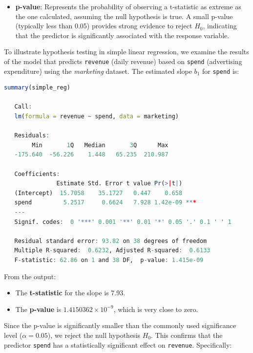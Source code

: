 \documentclass[
]{book}
\newcommand{\passthrough}[1]{#1}
\providecommand{\tightlist}{%
  \setlength{\itemsep}{0pt}\setlength{\parskip}{0pt}}
\theoremstyle{definition}
\theoremstyle{definition}
\theoremstyle{definition}
\theoremstyle{definition}
\theoremstyle{remark}
\begin{document}
\begin{itemize}
\tightlist
\item
  \textbf{p-value}: Represents the probability of observing a t-statistic as extreme as the one calculated, assuming the null hypothesis is true. A small p-value (typically less than 0.05) provides strong evidence to reject \(H_0\), indicating that the predictor is significantly associated with the response variable.
\end{itemize}

To illustrate hypothesis testing in simple linear regression, we examine the results of the model that predicts \passthrough{\lstinline!revenue!} (daily revenue) based on \passthrough{\lstinline!spend!} (advertising expenditure) using the \emph{marketing} dataset. The estimated slope \(b_1\) for \passthrough{\lstinline!spend!} is:

\begin{lstlisting}[language=R]
summary(simple_reg)
   
   Call:
   lm(formula = revenue ~ spend, data = marketing)
   
   Residuals:
        Min       1Q   Median       3Q      Max 
   -175.640  -56.226    1.448   65.235  210.987 
   
   Coefficients:
               Estimate Std. Error t value Pr(>|t|)    
   (Intercept)  15.7058    35.1727   0.447    0.658    
   spend         5.2517     0.6624   7.928 1.42e-09 ***
   ---
   Signif. codes:  0 '***' 0.001 '**' 0.01 '*' 0.05 '.' 0.1 ' ' 1
   
   Residual standard error: 93.82 on 38 degrees of freedom
   Multiple R-squared:  0.6232, Adjusted R-squared:  0.6133 
   F-statistic: 62.86 on 1 and 38 DF,  p-value: 1.415e-09
\end{lstlisting}

From the output:

\begin{itemize}
\tightlist
\item
  The \textbf{t-statistic} for the slope is 7.93.\\
\item
  The \textbf{p-value} is \ensuremath{1.4150362\times 10^{-9}}, which is very close to zero.
\end{itemize}

Since the p-value is significantly smaller than the commonly used significance level (\(\alpha = 0.05\)), we reject the null hypothesis \(H_0\). This confirms that the predictor \passthrough{\lstinline!spend!} has a statistically significant effect on \passthrough{\lstinline!revenue!}. Specifically:
\end{document}

